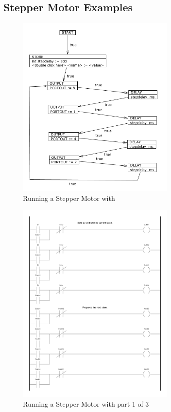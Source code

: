 
\subsection*{Stepper Motor Examples}

\begin{figure}[h]
    \centering
    \includegraphics[width=0.7\textwidth]{./images/lcc_steppermotor.png}
    \caption{Running a Stepper Motor with \emphasize{\plcchart}}
    \label{fig:lcc_steppermotor}
\end{figure}

%

\begin{figure}[h]
    \centering
    \includegraphics[width=0.7\textwidth]{./images/ladderlogic_stepper1.pdf}
    \caption{Running a Stepper Motor with  part 1 of 3}
    \label{fig:ladderlogic_stepper1}
\end{figure}

